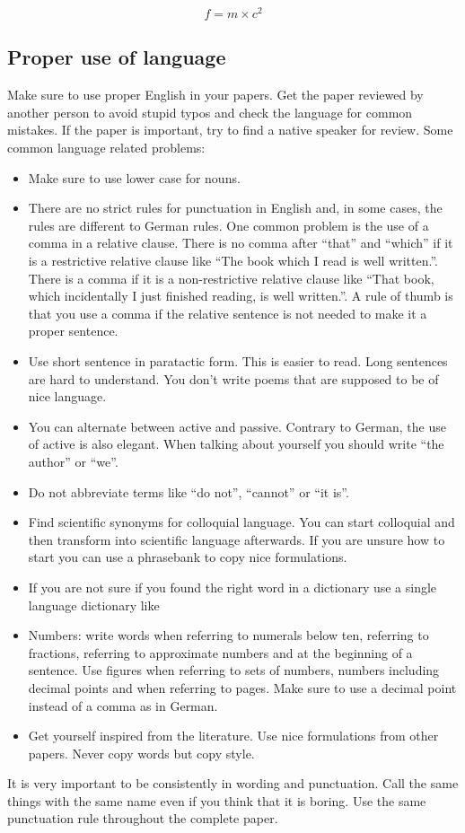 \begin{equation}
f = m \times c^2
\label{einstein}
\end{equation}

\subsection{Proper use of language}
Make sure to use proper English in your papers. Get the paper reviewed by another person to avoid stupid typos and check the language for common mistakes. If the paper is important, try to find a native speaker for review. Some common language related problems:
\begin{itemize}
\item Make sure to use lower case for nouns.
\item There are no strict rules for punctuation in English and, in some cases, the rules are different to German rules. One common problem is the use of a comma in a relative clause. There is no comma after ``that'' and ``which'' if it is a restrictive relative clause like ``The book which I read is well written.''. There is a comma if it is a non-restrictive relative clause like ``That book, which incidentally I just finished reading, is well written.''. A rule of thumb is that you use a comma if the relative sentence is not needed to make it a proper sentence.
\item Use short sentence in paratactic form. This is easier to read. Long sentences are hard to understand. You don't write poems that are supposed to be of nice language.
\item You can alternate between active and passive. Contrary to German, the use of active is also elegant. When talking about yourself you should write ``the author'' or ``we''. 
\item Do not abbreviate terms like ``do not'', ``cannot'' or ``it is''.
\item Find scientific synonyms for colloquial language. You can start colloquial and then transform into scientific language afterwards. If you are unsure how to start you can use a phrasebank 
	to copy nice formulations.
\item If you are not sure if you found the right word in a dictionary use a single language dictionary like %
\item Numbers: write words when referring to numerals below ten, referring to fractions, referring to approximate numbers and at the beginning of a sentence. Use figures when referring to sets of numbers, numbers including decimal points and when referring to pages. Make sure to use a decimal point instead of a comma as in German. 
\item	Get yourself inspired from the literature. Use nice formulations from other papers. Never copy words but copy style.  
\end{itemize} 
It is very important to be consistently in wording and punctuation. Call the same things with the same name even if you think that it is boring. Use the same punctuation rule throughout the complete paper. 

